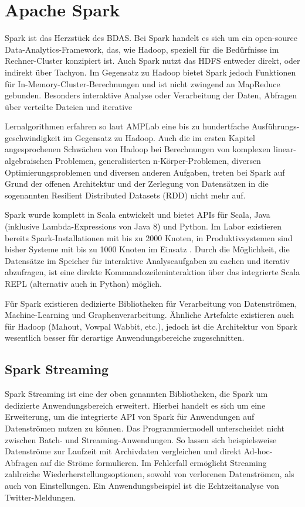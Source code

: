 \section{Apache Spark}
\label{section:apache Spark}

Spark ist das Herzstück des BDAS. Bei Spark handelt es sich um ein open-source Data-Analytics-Framework, das, wie Hadoop, speziell für die Bedürfnisse im Rechner-Cluster konzipiert ist. Auch Spark nutzt das HDFS entweder direkt, oder indirekt über Tachyon. Im Gegensatz zu Hadoop bietet Spark jedoch Funktionen für In-Memory-Cluster-Berechnungen und ist nicht zwingend an MapReduce gebunden. Besonders interaktive Analyse oder Verarbeitung der Daten, Abfragen über verteilte Dateien und iterative 

Lernalgorithmen erfahren so laut AMPLab eine bis zu hundertfache Ausführungs-geschwindigkeit im Gegensatz zu Hadoop. Auch die im ersten Kapitel angesprochenen Schwächen von Hadoop bei Berechnungen von komplexen linear-algebraischen Problemen, generalisierten n-Körper-Problemen, diversen Optimierungsproblemen und diversen anderen Aufgaben, treten bei Spark auf Grund der offenen Architektur und der Zerlegung von Datensätzen in die sogenannten Resilient Distributed Datasets (RDD) nicht mehr auf.

Spark wurde komplett in Scala entwickelt und bietet APIs für Scala, Java (inklusive Lambda-Expressions von Java 8) und Python. Im Labor existieren bereits Spark-Installationen mit bis zu 2000 Knoten, in Produktivsystemen sind bisher Systeme mit bis zu 1000 Knoten im Einsatz . Durch die Möglichkeit, die Datensätze im Speicher für interaktive Analyseaufgaben zu cachen und iterativ abzufragen, ist eine direkte Kommandozeileninteraktion über das integrierte Scala REPL (alternativ auch in Python) möglich. 

Für Spark existieren dedizierte Bibliotheken für Verarbeitung von Datenströmen, Machine-Learning und Graphenverarbeitung. Ähnliche Artefakte existieren auch für Hadoop (Mahout, Vowpal Wabbit, etc.), jedoch ist die Architektur von Spark wesentlich besser für derartige Anwendungsbereiche zugeschnitten. 
   
\subsection{Spark Streaming}
\label{section:spark Streaming}


Spark Streaming ist eine der oben genannten Bibliotheken, die Spark um dedizierte Anwendungsbereich erweitert. Hierbei handelt es sich um eine Erweiterung, um die integrierte API von Spark für Anwendungen auf Datenströmen nutzen zu können. Das Programmiermodell unterscheidet nicht zwischen Batch- und Streaming-Anwendungen. So lassen sich beispielsweise Datenströme zur Laufzeit mit Archivdaten vergleichen und direkt Ad-hoc-Abfragen auf die Ströme formulieren. Im Fehlerfall ermöglicht Streaming zahlreiche Wiederherstellungsoptionen, sowohl von verlorenen Datenströmen, als auch von Einstellungen. Ein Anwendungsbeispiel ist die Echtzeitanalyse von Twitter-Meldungen. 

